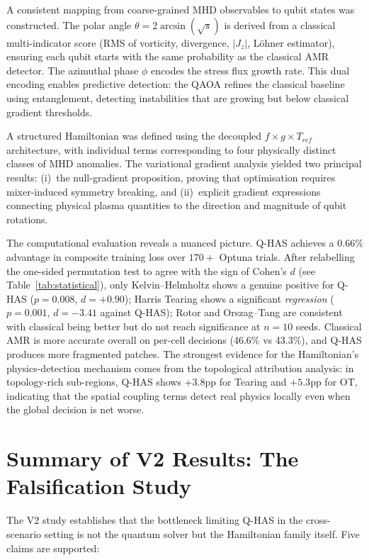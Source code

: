 \documentclass[12pt, a4paper, oneside]{report}
\begin{document}
A consistent mapping from coarse-grained MHD observables to qubit states was constructed. The polar angle $\theta = 2 \arcsin(\sqrt{s})$ is derived from a classical multi-indicator score (RMS of vorticity, divergence, $|J_z|$, L\"ohner estimator), ensuring each qubit starts with the same probability as the classical AMR detector. The azimuthal phase $\phi$ encodes the stress flux growth rate. This dual encoding enables predictive detection: the QAOA refines the classical baseline using entanglement, detecting instabilities that are growing but below classical gradient thresholds.

A structured Hamiltonian was defined using the decoupled $f \times g \times T_{rcf}$ architecture, with individual terms corresponding to four physically distinct classes of MHD anomalies. The variational gradient analysis yielded two principal results: (i)~the null-gradient proposition, proving that optimisation requires mixer-induced symmetry breaking, and (ii)~explicit gradient expressions connecting physical plasma quantities to the direction and magnitude of qubit rotations.

The computational evaluation reveals a nuanced picture. Q-HAS achieves a $0.66\%$ advantage in composite training loss over $170+$ Optuna trials. After relabelling the one-sided permutation test to agree with the sign of Cohen's $d$ (see Table~\ref{tab:statistical}), only Kelvin--Helmholtz shows a genuine positive for Q-HAS ($p = 0.008$, $d = +0.90$); Harris Tearing shows a significant \emph{regression} ($p = 0.001$, $d = -3.41$ against Q-HAS); Rotor and Orszag--Tang are consistent with classical being better but do not reach significance at $n=10$ seeds. Classical AMR is more accurate overall on per-cell decisions (46.6\% vs 43.3\%), and Q-HAS produces more fragmented patches. The strongest evidence for the Hamiltonian's physics-detection mechanism comes from the topological attribution analysis: in topology-rich sub-regions, Q-HAS shows $+3.8$pp for Tearing and $+5.3$pp for OT, indicating that the spatial coupling terms detect real physics locally even when the global decision is net worse.

\section{Summary of V2 Results: The Falsification Study}

The V2 study establishes that the bottleneck limiting Q-HAS in the cross-scenario setting is not the quantum solver but the Hamiltonian family itself. Five claims are supported:
\end{document}
